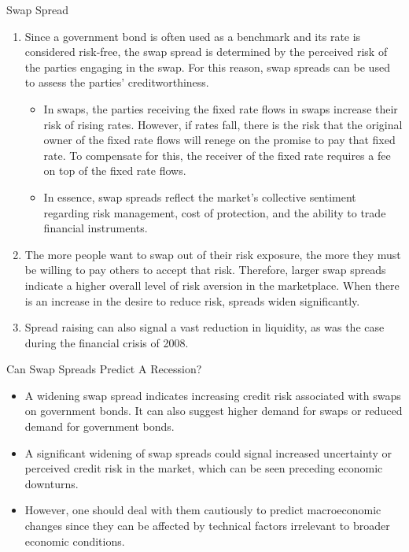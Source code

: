 \documentclass{beamer}
\begin{document}
\begin{frame}{Swap Spread}
\begin{enumerate}
	\item Since a government bond is often used as a benchmark and its rate is considered risk-free, the swap spread is determined by the perceived risk of the parties engaging in the swap. For this reason, swap spreads can be used to assess the parties' creditworthiness.
	\begin{itemize}
		\item In swaps, the parties receiving the fixed rate flows in swaps increase their risk of rising rates. However, if rates fall, there is the risk that the original owner of the fixed rate flows will renege on the promise to pay that fixed rate. To compensate for this, the receiver of the fixed rate requires a fee on top of the fixed rate flows.
		\item In essence, swap spreads reflect the market's collective sentiment regarding risk management, cost of protection, and the ability to trade financial instruments.
	\end{itemize}
	\item The more people want to swap out of their risk exposure, the more they must be willing to pay others to accept that risk. Therefore, larger swap spreads indicate a higher overall level of risk aversion in the marketplace. When there is an increase in the desire to reduce risk, spreads widen significantly.
	\item Spread raising can also signal a vast reduction in liquidity, as was the case during the financial crisis of 2008.
\end{enumerate}
\end{frame}

\begin{frame}{Can Swap Spreads Predict A Recession?}
	\begin{itemize}
		\item A widening swap spread indicates increasing credit risk associated with swaps on government bonds. It can also suggest higher demand for swaps or reduced demand for government bonds. 
		\item A significant widening of swap spreads could signal increased uncertainty or perceived credit risk in the market, which can be seen preceding economic downturns.
		\item However, one should deal with them cautiously to predict macroeconomic changes since they can be affected by technical factors irrelevant to broader economic conditions.
	\end{itemize}
\end{frame}
\end{document}
